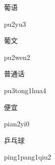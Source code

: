 \begin{verbete}[pu2yu3]{葡语}
\begin{pronuncia}{pu2yu3}
\end{pronuncia}
\end{verbete}

\begin{verbete}[pu2wen2]{葡文}
\begin{pronuncia}{pu2wen2}
\end{pronuncia}
\end{verbete}

\begin{verbete}{普通话}
\begin{pronuncia}{pu3tong1hua4}
\end{pronuncia}
\end{verbete}

\begin{verbete}[pian2yi0]{便宜}
\begin{pronuncia}{pian2yi0}
\end{pronuncia}
\end{verbete}

\begin{verbete}{乒乓球}
\begin{pronuncia}{ping1pang1qiu2}
\end{pronuncia}
\end{verbete}

